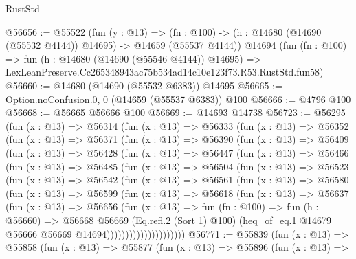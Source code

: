 \begin{lexlean}{RustStd}
\begin{coremodule}
@56656 := @55522
    (fun (y : @13) =>
    (fn : @100) -> (h : @14680 (@14690 (@55532 @4144)) @14695) -> @14659 (@55537 @4144))
    @14694
    (fun (fn : @100) =>
    fun (h : @14680 (@14690 (@55546 @4144)) @14695) =>
    LexLeanPreserve.Cc265348943ac75b534ad14c10e123f73.R53.RustStd.fun58)
@56660 := @14680 (@14690 (@55532 @6383)) @14695
@56665 := Option.noConfusion.{0, 0} (@14659 (@55537 @6383)) @100
@56666 := @4796 @100
@56668 := @56665 @56666 @100
@56669 := @14693 @14738
@56723 := @56295
    (fun (x : @13) =>
    @56314
      (fun (x : @13) =>
      @56333
        (fun (x : @13) =>
        @56352
          (fun (x : @13) =>
          @56371
            (fun (x : @13) =>
            @56390
              (fun (x : @13) =>
              @56409
                (fun (x : @13) =>
                @56428
                  (fun (x : @13) =>
                  @56447
                    (fun (x : @13) =>
                    @56466
                      (fun (x : @13) =>
                      @56485
                        (fun (x : @13) =>
                        @56504
                          (fun (x : @13) =>
                          @56523
                            (fun (x : @13) =>
                            @56542
                              (fun (x : @13) =>
                              @56561
                                (fun (x : @13) =>
                                @56580
                                  (fun (x : @13) =>
                                  @56599
                                    (fun (x : @13) =>
                                    @56618
                                      (fun (x : @13) =>
                                      @56637
                                        (fun (x : @13) =>
                                        @56656
                                          (fun (x : @13) =>
                                          fun (fn : @100) =>
                                          fun (h : @56660) =>
                                          @56668
                                            @56669
                                            (Eq.refl.{2} (Sort 1) @100)
                                            (heq_of_eq.{1}
                                              @14679
                                              @56666
                                              @56669
                                              @14694)))))))))))))))))))))
@56771 := @55839
    (fun (x : @13) =>
    @55858
      (fun (x : @13) =>
      @55877
        (fun (x : @13) =>
        @55896
          (fun (x : @13) =>

\end{coremodule}
\end{lexlean}
